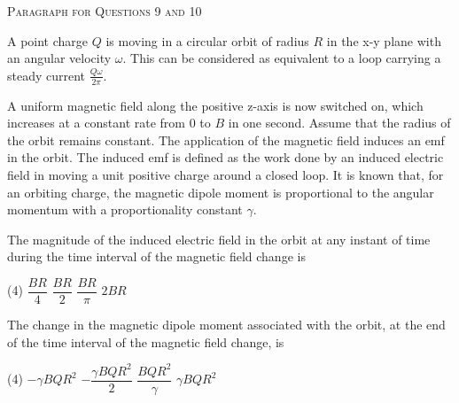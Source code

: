 \begin{center}
    \textsc{Paragraph for Questions 9 and 10}
\end{center}

A point charge $Q$ is moving in a circular orbit of radius $R$ in the x-y plane with an angular velocity $\omega$. This can be considered as equivalent to a loop carrying a steady current $\frac{Q\omega}{2\pi}$. 

A uniform magnetic field along the positive z-axis is now switched on, which increases at a constant rate from $0$ to $B$ in one second. Assume that the radius of the orbit remains constant. The application of the magnetic field induces an emf in the orbit. The induced emf is defined as the work done by an induced electric field in moving a unit positive charge around a closed loop. It is known that, for an orbiting charge, the magnetic dipole moment is proportional to the angular momentum with a proportionality constant $\gamma$. 

\item The magnitude of the induced electric field in the orbit at any instant of time during the time interval of the magnetic field change is
    \begin{tasks}(4)
        \task $\dfrac{BR}{4}$
        \task $\dfrac{BR}{2}$\ans
        \task $\dfrac{BR}{\pi}$
        \task $2BR$
    \end{tasks}

\item The change in the magnetic dipole moment associated with the orbit, at the end of the time interval of the magnetic field change, is
    \begin{tasks}(4)
        \task $-\gamma BQR^2$
        \task $-\dfrac{\gamma BQR^2}{2}$\ans
        \task $\dfrac{BQR^2}{\gamma}$
        \task $\gamma BQR^2$
    \end{tasks}